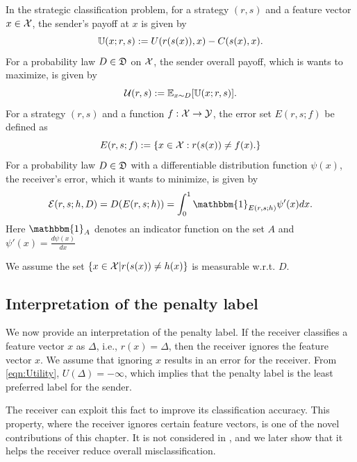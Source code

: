 In the strategic classification problem, for a strategy $(r,s)$ and a feature vector $x \in \mathcal{X}$, the sender's payoff at $x$ is given by
\begin{equation}
	\mathbb{U}(x;r,s):= U(r(s(x)),x) - C(s(x),x).
\end{equation}
For a probability law $D \in \mathfrak{D}$ on $\mathcal{X}$, the sender overall payoff, which is wants to maximize, is given by
\begin{equation}\label{eqn:Sender's payoff}
	\mathcal{U}(r,s) :=\mathbb{E}_{x \sim D}[\mathbb{U}(x;r,s)].
\end{equation}
For a strategy $(r,s)$ and a function $f: \mathcal{X} \rightarrow \mathcal{Y}$, the error set $E(r,s;f)$ be defined as
\begin{equation}\label{eqn:error set}
    E(r,s;f  ) := \{x \in \mathcal{X}: r(s(x)) \neq f(x).\}
\end{equation}
 For a probability law $D \in \mathfrak{D}$ with a differentiable distribution function $\psi(x)$,
the receiver's error, which it wants to minimize, is given by
\begin{equation}\label{eqn:Average loss}
	\cg{E}(r,s;h,D) = D(E(r,s;h)) = \int_0^1 \mathbbm{1}_{E(r,s;h)}{\psi'}(x)dx.
\end{equation}
Here $\mathbbm{1}_A$ denotes an indicator function on the set $A$ and
$\psi'(x) = \frac{d\psi(x)}{dx}$


\begin{rem}
	We assume the set $\{x \in \mathcal{X}| r(s(x)) \neq h(x)\}$ is measurable w.r.t. $D$.
\end{rem}

\subsection{Interpretation of the penalty label}
We now provide an interpretation of the penalty label. If the receiver classifies a feature vector $x$ as  $\Delta$, i.e., $r(x) = \Delta$, then the receiver ignores the feature vector $x$. We assume that ignoring $x$ results in an error for the receiver. From \eqref{eqn:Utility}, $U(\Delta) = -\infty$, which implies that the penalty label is the least preferred label for the sender.

The receiver can exploit this fact to improve its classification accuracy. This property, where the receiver ignores certain feature vectors, is one of the novel contributions of this chapter. It is not considered in \cite{hardt2016strategic}, and we later show that it helps the receiver reduce overall misclassification.


